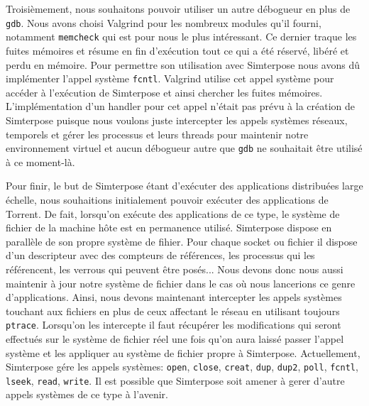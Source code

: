 \vspace{0.5cm}
Troisièmement, nous souhaitons pouvoir utiliser un autre débogueur en plus de \texttt{gdb}. Nous avons choisi Valgrind pour les nombreux modules qu'il fourni, notamment \texttt{memcheck} qui est pour nous le plus intéressant. Ce dernier traque les fuites mémoires et résume en fin d'exécution tout ce qui a été réservé, libéré et perdu en mémoire. Pour permettre son utilisation avec Simterpose nous avons dû implémenter l'appel système \texttt{fcntl}. Valgrind utilise cet appel système pour accéder à l'exécution de Simterpose et ainsi chercher les fuites mémoires. L'implémentation d'un handler pour cet appel n'était pas prévu à la création de Simterpose puisque nous voulons juste intercepter les appels systèmes réseaux, temporels et gérer les processus et leurs threads pour maintenir notre environnement virtuel et aucun débogueur autre que \texttt{gdb} ne souhaitait être utilisé à ce moment-là.

 \vspace{0.5cm}
Pour finir, le but de Simterpose étant d'exécuter des applications distribuées large échelle, nous souhaitions initialement pouvoir exécuter des applications de Torrent. De fait, lorsqu'on exécute des applications de ce type, le système de fichier de la machine hôte est en permanence utilisé. Simterpose dispose en parallèle de son propre système de fihier. Pour chaque socket ou fichier il dispose d'un descripteur avec des compteurs de références, les processus qui les référencent, les verrous qui peuvent être posés... Nous devons donc nous aussi maintenir à jour notre système de fichier dans le cas où nous lancerions ce genre d'applications. Ainsi, nous devons maintenant intercepter les appels systèmes touchant aux fichiers en plus de ceux affectant le réseau en utilisant toujours \texttt{ptrace}. Lorsqu'on les intercepte il faut récupérer les modifications qui seront effectués sur le système de fichier réel une fois qu'on aura laissé passer l'appel système et les appliquer au système de fichier propre à Simterpose. Actuellement, Simterpose gére les appels systèmes: \texttt{open},  \texttt{close}, \texttt{creat}, \texttt{dup}, \texttt{dup2}, \texttt{poll}, \texttt{fcntl}, \texttt{lseek}, \texttt{read}, \texttt{write}. Il est possible que Simterpose soit amener à gerer d'autre appels systèmes de ce type à l'avenir.
